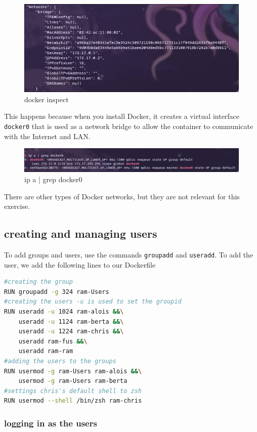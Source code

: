 \documentclass[a4paper]{article}
\begin{document}
\begin{figure}[h]
	\centering
	\includegraphics[scale=0.3]{images/docker_inspect_nw.png}
	\caption{docker inspect}
\end{figure}
This happens because when you install Docker, it creates a virtual interface \texttt{docker0} that is used as a network bridge to allow the container to communicate with the Internet and LAN. \cite{docker-networking-video}
\begin{figure}[h]
	\centering
	\includegraphics[scale=0.3]{images/ipadocker.png}
	\caption{ip a | grep docker0}
\end{figure}
There are other types of Docker networks, but they are not relevant for this exercise.\cite{docker-networking-video}

\newpage
\subsection{creating and managing users}

To add groups and users, use the commands \texttt{groupadd} and \texttt{useradd}.
To add the user, we add the following lines to our Dockerfile
\begin{lstlisting}[language=bash]
#creating the group
RUN groupadd -g 324 ram-Users 
#creating the users -u is used to set the groupid
RUN useradd -u 1024 ram-alois &&\
    useradd -u 1124 ram-berta &&\
    useradd -u 1224 ram-chris &&\
    useradd ram-fus &&\
    useradd ram-ram
#adding the users to the groups
RUN usermod -g ram-Users ram-alois &&\
    usermod -g ram-Users ram-berta
#settings chris's default shell to zsh
RUN usermod --shell /bin/zsh ram-chris 
\end{lstlisting}
\subsubsection{logging in as the users}
\end{document}
